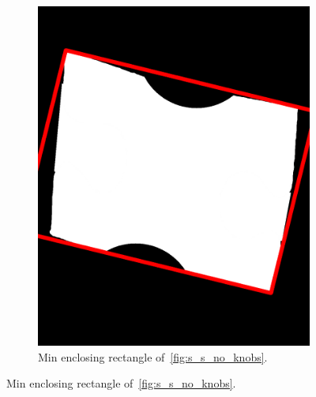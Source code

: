 \documentclass{article}
\begin{document}
\begin{figure}
\begin{subfigure}{0.3\textwidth}
    \includegraphics[width=\linewidth]{pictures/find_corners_min_enclosing_rectangle.png}
    \caption{Min enclosing rectangle of~\cref{fig:s_s_no_knobs}.}
    \label{fig:s_s_min_enc_rec}
  \end{subfigure}
\end{figure}
\clearpage
\end{document}
